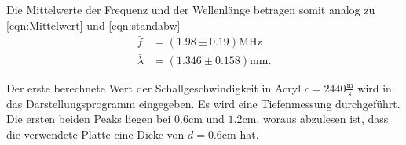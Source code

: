 Die Mittelwerte der Frequenz und der Wellenlänge betragen somit analog zu \autoref{eqn:Mittelwert} und \autoref{eqn:standabw} 
\begin{align*}
  \bar{f} &= (1.98 \pm 0.19) \si{\mega\hertz}\\
  \bar{\lambda} &= (1.346 \pm 0.158) \si{\milli\meter}.
\end{align*}

Der erste berechnete Wert der Schallgeschwindigkeit in Acryl $c=2440 \frac{\si{\meter}}{\si{\second}}$ wird in das Darstellungsprogramm eingegeben.
Es wird eine Tiefenmessung durchgeführt. Die ersten beiden Peaks liegen bei $0.6 \si{\centi\meter}$ und $1.2 \si{\centi\meter}$, woraus abzulesen ist, dass die 
verwendete Platte eine Dicke von $d=0.6\si{\centi\meter}$ hat.\\

